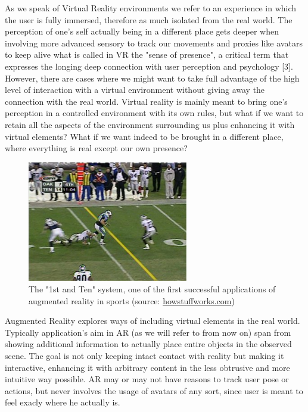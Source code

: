 As we speak of Virtual Reality environments we refer to an experience in which the user is fully immersed, therefore as much isolated from the real world. The perception of one’s self actually being in a different place gets deeper when involving more advanced sensory to track our movements and proxies like avatars to keep alive what is called in VR the "sense of presence", a critical term that expresses the longing deep connection with user perception and psychology [3]. However, there are cases where we might want to take full advantage of the high level of interaction with a virtual environment without giving away the connection with the real world. Virtual reality is mainly meant to bring one’s perception in a controlled environment with its own rules, but what if we want to retain all the aspects of the environment surrounding us plus enhancing it with virtual elements? What if we want indeed to be brought in a different place, where everything is real except our own presence?
\begin{figure}
\centering
\includegraphics[width=7cm]{pictures/1st_and_ten}
\caption{The "1st and Ten" system, one of the first successful applications of augmented reality in sports (source: \href{http://www.howstuffworks.com/first-down-line.htm}{howstuffworks.com})}
\label{fig:rugby_ar}
\end{figure}

Augmented Reality explores ways of including virtual elements in the real world. Typically application’s aim in AR (as we will refer to from now on) span from showing additional information to actually place entire objects in the observed scene. The goal is not only keeping intact contact with reality but making it interactive, enhancing it with arbitrary content in the less obtrusive and more intuitive way possible. AR may or may not have reasons to track user pose or actions, but never involves the usage of avatars of any sort, since user is meant to feel exacly where he actually is.

